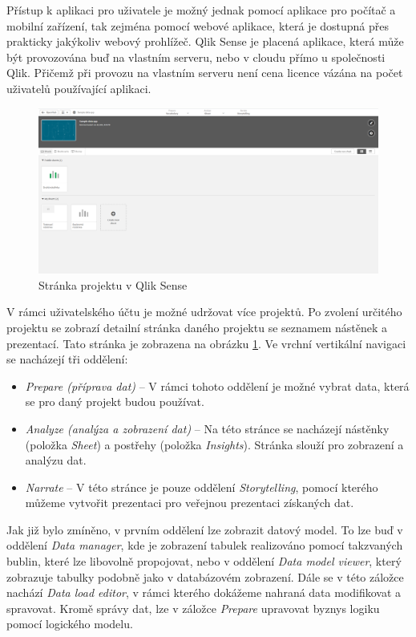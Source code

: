\documentclass[czech,master]{diploma}
\begin{document}
Přístup k aplikaci pro uživatele je možný jednak pomocí aplikace pro počítač a mobilní zařízení, tak zejména pomocí webové aplikace, která je dostupná přes prakticky jakýkoliv webový prohlížeč. Qlik Sense je placená aplikace, která může být provozována buď na vlastním serveru, nebo v cloudu přímo u společnosti Qlik. Přičemž při provozu na vlastním serveru není cena licence vázána na počet uživatelů používající aplikaci.

\begin{figure}[!ht]
    \centering
    \includegraphics[width=1\textwidth]{Diplomka/Figures/qlik_project.png}
    \caption{Stránka projektu v Qlik Sense}
    \label{fig:qlik_project}
\end{figure}


V rámci uživatelského účtu je možné udržovat více projektů. Po zvolení určitého projektu se zobrazí detailní stránka daného projektu se seznamem nástěnek a prezentací. Tato stránka je zobrazena na obrázku \ref{fig:qlik_project}.  Ve vrchní vertikální navigaci se nacházejí tři oddělení:

\begin{itemize}
\item \textit{Prepare (příprava dat)} -- V rámci tohoto oddělení je možné vybrat data, která se pro daný projekt budou používat.
\item \textit{Analyze (analýza a zobrazení dat)} -- Na této stránce se nacházejí nástěnky (položka \textit{Sheet}) a postřehy (položka \textit{Insights}). Stránka slouží pro zobrazení a analýzu dat.
\item \textit{Narrate} -- V této stránce je pouze oddělení \textit{Storytelling}, pomocí kterého můžeme vytvořit prezentaci pro veřejnou prezentaci získaných dat.
\end{itemize}


Jak již bylo zmíněno, v prvním oddělení lze zobrazit datový model. To lze buď v oddělení \textit{Data manager}, kde je zobrazení tabulek realizováno pomocí takzvaných bublin, které lze libovolně propojovat, nebo v oddělení \textit{Data model viewer}, který zobrazuje tabulky podobně jako v databázovém zobrazení. Dále se v této záložce nachází \textit{Data load editor}, v rámci kterého dokážeme nahraná data modifikovat a spravovat. Kromě správy dat, lze v záložce \textit{Prepare} upravovat byznys logiku pomocí logického modelu.
\end{document}
